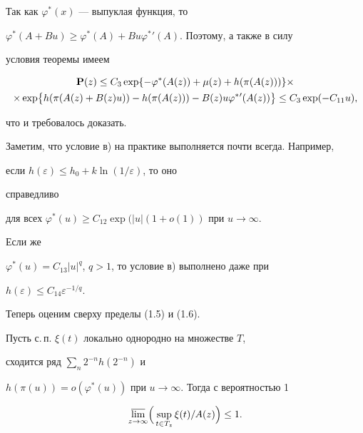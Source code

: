 Так как $\varphi^*(x)$ --- выпуклая функция, то 


$\varphi^*(A+Bu)\ge\varphi^*(A)+Bu\varphi^*{}'(A)$. Поэтому, а также в силу 


условия теоремы имеем 


\begin{gather*} 


{\bold P}(z)\le C_3\exp\{-\varphi^*(A(z))+\mu(z)+h(\pi(A(z)))\}\times\\ 


\times\exp\bigl\{h(\pi(A(z)+B(z)u))-h(\pi(A(z)))- 


B(z)u\varphi^*{}'(A(z))\bigr\}\le 


C_3\exp(-C_{11}u), 


\end{gather*} 


что и требовалось доказать. 


\medskip


 


Заметим, что условие в) на практике выполняется почти всегда. Например, 


если $h(\varepsilon)\le h_0+k\ln(1/\varepsilon)$, то оно 


справедливо 


для всех $\varphi^*(u)\ge C_{12}\exp(|u|(1+o(1))$ при $u\to\infty$. 


Если же 


$\varphi^*(u)=C_{13}|u|^q$, $q>1$, то условие в) выполнено даже при 


$h(\varepsilon)\le C_{14}\varepsilon^{-1/q}$.


 


Теперь оценим сверху пределы (1.5) и (1.6). 


 


\begin{thms} Пусть с.\,п. $\xi(t)$ локально однородно на множестве $T$, 


сходится ряд $\sum\limits_n2^{-n}h(2^{-n})$ и 


$h(\pi(u))=o(\varphi^*(u))$ при $u\to\infty$. Тогда с вероятностью 1 


$$ 


\underset{z\to\infty}{\varlimsup}\Bigl(\, 


\sup_{t\in T_z}\xi(t)/A(z)\Bigr)\le 1. 


$$ 


\end{thms} 


